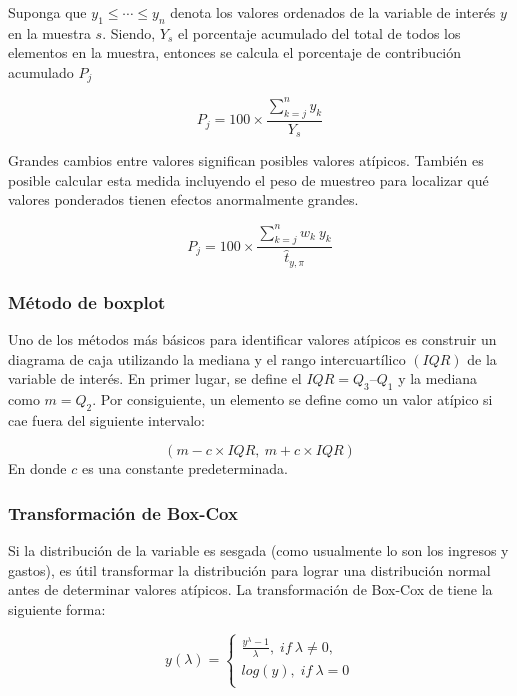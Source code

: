 \documentclass[
  10pt,
  spanish,
]{book}
\begin{document}
Suponga que \(y_1\le\cdots\le y_n\) denota los valores ordenados de la variable de interés \(y\) en la muestra \(s\). Siendo, \(Y_s\) el porcentaje acumulado del total de todos los elementos en la muestra, entonces se calcula el porcentaje de contribución acumulado \(P_j\)

\[
P_j=100\times\frac{\sum_{k=j}^n y_k}{Y_s}
\]

Grandes cambios entre valores significan posibles valores atípicos. También es posible calcular esta medida incluyendo el peso de muestreo para localizar qué valores ponderados tienen efectos anormalmente grandes.

\[
P_j=100\times\frac{\sum_{k=j}^n w_k\ y_k}{\hat t_{y, \pi}}
\]

\hypertarget{muxe9todo-de-boxplot}{%
\subsubsection*{Método de boxplot}\label{muxe9todo-de-boxplot}}

Uno de los métodos más básicos para identificar valores atípicos es construir un diagrama de caja utilizando la mediana y el rango intercuartílico \((IQR)\) de la variable de interés. En primer lugar, se define el \(IQR=Q_3–Q_1\) y la mediana como \(m=Q_2\). Por consiguiente, un elemento se define como un valor atípico si cae fuera del siguiente intervalo:

\[
(m-c \times IQR,\ m+c \times IQR)
\]
En donde \(c\) es una constante predeterminada.

\hypertarget{transformaciuxf3n-de-box-cox}{%
\subsubsection*{Transformación de Box-Cox}\label{transformaciuxf3n-de-box-cox}}

Si la distribución de la variable es sesgada (como usualmente lo son los ingresos y gastos), es útil transformar la distribución para lograr una distribución normal antes de determinar valores atípicos. La transformación de Box-Cox de tiene la siguiente forma:

\[
y(\lambda)=\left\{\begin{matrix}\frac{y^\lambda-1}{\lambda},\;if\ \lambda\neq0,\\log(y),\;if\ \lambda=0\\\end{matrix}\right.
\]
\end{document}
